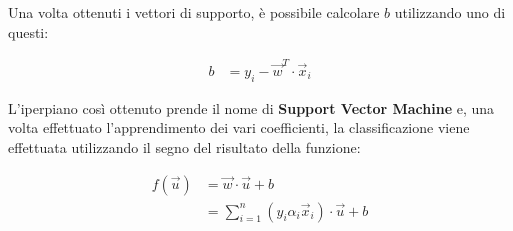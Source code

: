 Una volta ottenuti i vettori di supporto, è possibile calcolare $b$ utilizzando uno di questi:

\begin{align*}
b &= y_i - \vec{w}^T \cdot \vec{x}_i
\end{align*}

L'iperpiano così ottenuto prende il nome di \textbf{Support Vector Machine} e, una volta effettuato l'apprendimento dei vari coefficienti, la classificazione viene effettuata utilizzando il segno del risultato della funzione:

\begin{align*}
f(\vec{u}) &= \vec{w} \cdot \vec{u} + b \\
	  &= \sum\limits_{i = 1}^n (y_i  \alpha_i  \vec{x}_i ) \cdot \vec{u} + b
\end{align*}

